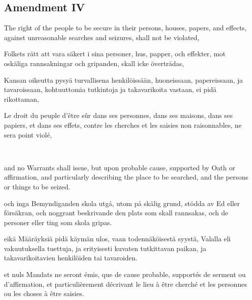 \documentclass[a4,landscape,12pt]{article}
\begin{document}
\subsection*{Amendment IV}
\begin{minipage}[t]{0.22\textwidth}
The right of the people to be secure in their persons, houses, papers, and effects, against unreasonable searches and seizures, shall not be violated,
\end{minipage}\textwidth
\begin{minipage}[t]{0.22\textwidth}
Folkets rätt att vara säkert i sina personer, hus, papper, och effekter, mot oskäliga rannsakningar och gripanden, skall icke överträdas,
\end{minipage}\textwidth
\begin{minipage}[t]{0.22\textwidth}
Kansan oikeutta pysyä turvallisena henkilöissään, huoneissaan, papereissaan, ja tavaroissaan, kohtuuttomia tutkintoja ja takavarikoita vastaan, ei pidä rikottaman,
\end{minipage}\textwidth
\begin{minipage}[t]{0.22\textwidth}
Le droit du peuple d'être sûr dans ses personnes, dans ses maisons, dans ses papiers, et dans ses effets, contre les cherches et les saisies non raisonnables, ne sera point violé, 
\end{minipage}

~

\begin{minipage}[t]{0.22\textwidth}
and no Warrants shall issue, but upon probable cause, supported by Oath or affirmation, and particularly describing the place to be searched, and the persons or things to be seized.
\end{minipage}\textwidth
\begin{minipage}[t]{0.22\textwidth}
och inga Bemyndiganden skola utgå, utom på skälig grund, stödda av Ed eller försäkran, och noggrant beskrivande den plats som skall rannsakas, och de personer eller ting som skola gripas.
\end{minipage}\textwidth
\begin{minipage}[t]{0.22\textwidth}
eikä Määräyksiä pidä käymän ulos, vaan todennäköisestä syystä, Valalla eli vakuutuksella tuettuja, ja erityisesti kuvaten tutkittavan paikan, ja takavarikoitavien henkilöiden tai tavaroiden.
\end{minipage}\textwidth
\begin{minipage}[t]{0.22\textwidth}
et nuls Mandats ne seront émis, que de cause probable, supportés de serment ou d'affirmation, et particulièrement décrivant le lieu à être cherché et les personnes ou les choses à être saisies.
\end{minipage}
\end{document}
